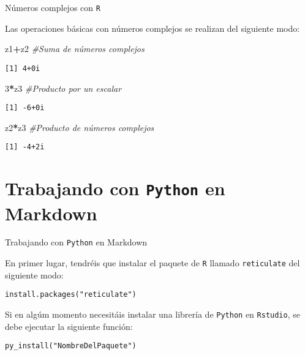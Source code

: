 \documentclass[
  ignorenonframetext,
]{beamer}
\newenvironment{Shaded}{\begin{snugshade}}{\end{snugshade}}
\newcommand{\CommentTok}[1]{\textcolor[rgb]{0.56,0.35,0.01}{\textit{#1}}}
\newcommand{\DecValTok}[1]{\textcolor[rgb]{0.00,0.00,0.81}{#1}}
\newcommand{\NormalTok}[1]{#1}
\newcommand{\OperatorTok}[1]{\textcolor[rgb]{0.81,0.36,0.00}{\textbf{#1}}}
\begin{document}
\begin{frame}[fragile]{Números complejos con \texttt{R}}
\protect\hypertarget{nuxfameros-complejos-con-r-7}{}

Las operaciones básicas con números complejos se realizan del siguiente
modo:

\begin{Shaded}
\begin{Highlighting}[]
\NormalTok{z1}\OperatorTok{+}\NormalTok{z2 }\CommentTok{#Suma de números complejos}
\end{Highlighting}
\end{Shaded}

\begin{verbatim}
[1] 4+0i
\end{verbatim}

\begin{Shaded}
\begin{Highlighting}[]
\DecValTok{3}\OperatorTok{*}\NormalTok{z3 }\CommentTok{#Producto por un escalar}
\end{Highlighting}
\end{Shaded}

\begin{verbatim}
[1] -6+0i
\end{verbatim}

\begin{Shaded}
\begin{Highlighting}[]
\NormalTok{z2}\OperatorTok{*}\NormalTok{z3 }\CommentTok{#Producto de números complejos}
\end{Highlighting}
\end{Shaded}

\begin{verbatim}
[1] -4+2i
\end{verbatim}

\end{frame}

\hypertarget{trabajando-con-python-en-markdown}{%
\section{\texorpdfstring{Trabajando con \texttt{Python} en
Markdown}{Trabajando con Python en Markdown}}\label{trabajando-con-python-en-markdown}}

\begin{frame}[fragile]{Trabajando con \texttt{Python} en Markdown}
\protect\hypertarget{trabajando-con-python-en-markdown-1}{}

En primer lugar, tendréis que instalar el paquete de \texttt{R} llamado
\texttt{reticulate} del siguiente modo:

\texttt{install.packages("reticulate")}

Si en algúm momento necesitáis instalar una librería de \texttt{Python}
en \texttt{Rstudio}, se debe ejecutar la siguiente función:

\texttt{py\_install("NombreDelPaquete")}

\end{frame}
\end{document}
